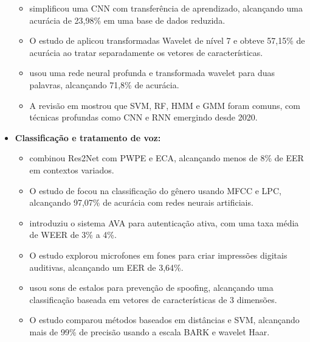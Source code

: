 \begin{frame}[allowframebreaks]
\begin{itemize}
\begin{itemize}
			\item \cite{tamm2020classification} simplificou uma CNN com transferência de aprendizado, alcançando uma acurácia de 23,98\% em uma base de dados reduzida.
			
			\item O estudo de \cite{Panachakel_2019} aplicou transformadas Wavelet de nível 7 e obteve 57,15\% de acurácia ao tratar separadamente os vetores de características.
			
			\item \cite{panachakel2020novel} usou uma rede neural profunda e transformada wavelet para duas palavras, alcançando 71,8\% de acurácia.
			
			\item A revisão em \cite{s23125575} mostrou que SVM, RF, HMM e GMM foram comuns, com técnicas profundas como CNN e RNN emergindo desde 2020.
		\end{itemize}
		
		
		
		\item \textbf{Classificação e tratamento de voz:} \begin{itemize}
			
			\item \cite{math11194205} combinou Res2Net com PWPE e ECA, alcançando menos de 8\% de EER em contextos variados.
			
			\item O estudo de \cite{ali2022speech} focou na classificação do gênero usando MFCC e LPC, alcançando 97,07\% de acurácia com redes neurais artificiais.
			
			\item \cite{WOS:000525844000004} introduziu o sistema AVA para autenticação ativa, com uma taxa média de WEER de 3\% a 4\%.
			
			\item O estudo \cite{10.1145/3448113} explorou microfones em fones para criar impressões digitais auditivas, alcançando um EER de 3,64\%.
			
			\item \cite{9744556} usou sons de estalos para prevenção de spoofing, alcançando uma classificação baseada em vetores de características de 3 dimensões.
			
			\item O estudo \cite{furlan2021caracterizacao} comparou métodos baseados em distâncias e SVM, alcançando mais de 99\% de precisão usando a escala BARK e wavelet Haar.

		\end{itemize}
	\end{itemize}
\end{frame}
